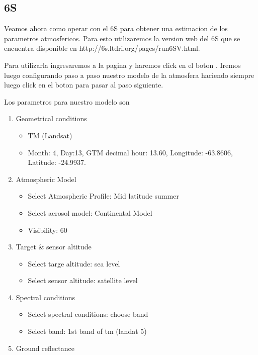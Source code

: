 \documentclass[a4paper]{article}
\begin{document}
\subsection{6S}
\label{sub:corr:6S}

Veamos ahora como operar con el 6S para obtener una estimacion de los parametros
atmosfericos. Para esto utilizaremos la version web del 6S que se encuentra
disponible en http://6s.ltdri.org/pages/run6SV.html.

Para utilizarla ingresaremos a la pagina y haremos click en el boton
. Iremos luego configurando paso a paso nuestro modelo de la
atmosfera haciendo siempre luego click en el boton  para
pasar al paso siguiente.

Los parametros para nuestro modelo son

\begin{enumerate}
    \item Geometrical conditions
        \begin{itemize}
            \item TM (Landsat)
            \item Month: 4, Day:13, GTM decimal hour: 13.60, Longitude:
                -63.8606, Latitude: -24.9937.
        \end{itemize}
    \item Atmospheric Model
        \begin{itemize}
            \item Select Atmospheric Profile: Mid latitude summer
            \item Select aerosol model: Continental Model
            \item Visibility: 60
        \end{itemize}
    \item Target \& sensor altitude
        \begin{itemize}
            \item Select targe altitude: sea level
            \item Select sensor altitude: satellite level
        \end{itemize}
    \item Spectral conditions
        \begin{itemize}
            \item Select spectral conditions: choose band
            \item Select band: 1st band of tm (landat 5)
        \end{itemize}
    \item Ground reflectance

\end{enumerate}
\end{document}
